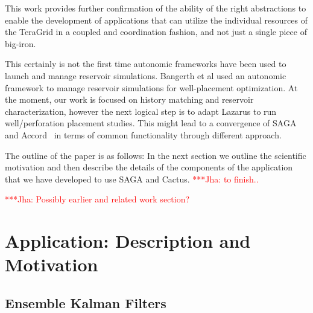 \documentclass[conference,final]{IEEEtran}
\newcommand{\jhanote}[1]{ {\textcolor{red} { ***Jha: #1 }}}
\newcommand{\jhanote}[1]{}
\begin{document}

This work provides further confirmation of the ability of the right
abstractions to enable the development of applications that can
utilize the individual resources of the TeraGrid in a coupled and
coordination fashion, and not just a single piece of big-iron.

This certainly is not the first time autonomic frameworks have been
used to launch and manage reservoir simulations. Bangerth et al
\cite{Manish} used an autonomic framework to manage reservoir
simulations for well-placement optimization. At the moment, our work
is focused on history matching and reservoir characterization, however
the next logical step is to adapt Lazarus to run well/perforation
placement studies. This might lead to a convergence of SAGA and
Accord~\cite{accord} in terms of common functionality through
different approach.

The outline of the paper is as follows: In the next section we outline
the scientific motivation and then describe the details of the
components of the application that we have developed to use SAGA and
Cactus.  \jhanote{to finish..}

\jhanote{Possibly earlier and related work section?}

\section{Application: Description and Motivation} 

\subsection{Ensemble Kalman Filters} 
\end{document}
